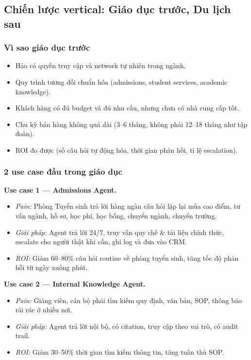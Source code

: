 \documentclass[11pt,a4paper]{article}
\begin{document}
\subsection{Chiến lược vertical: Giáo dục trước, Du lịch sau}

\subsubsection*{Vì sao giáo dục trước}

\begin{itemize}
\item Hảo có quyền truy cập và network tự nhiên trong ngành.
\item Quy trình tương đối chuẩn hóa (admissions, student services, academic knowledge).
\item Khách hàng có đủ budget và đủ nhu cầu, nhưng chưa có nhà cung cấp tốt.
\item Chu kỳ bán hàng không quá dài (3--6 tháng, không phải 12--18 tháng như tập đoàn).
\item ROI đo được (số câu hỏi tự động hóa, thời gian phản hồi, tỉ lệ escalation).
\end{itemize}

\subsubsection*{2 use case đầu trong giáo dục}

\textbf{Use case 1 — Admissions Agent.}
\begin{itemize}
\item \textit{Pain:} Phòng Tuyển sinh trả lời hàng ngàn câu hỏi lặp lại mùa cao điểm,
tư vấn ngành, hồ sơ, học phí, học bổng, chuyển ngành, chuyển trường.
\item \textit{Giải pháp:} Agent trả lời 24/7, truy vấn quy chế \& tài liệu chính
thức, escalate cho người thật khi cần, ghi log và đưa vào CRM.
\item \textit{ROI:} Giảm 60--80\% câu hỏi routine về phòng tuyển sinh, tăng tốc
độ phản hồi từ ngày xuống phút.
\end{itemize}

\textbf{Use case 2 — Internal Knowledge Agent.}
\begin{itemize}
\item \textit{Pain:} Giảng viên, cán bộ phải tìm kiếm quy định, văn bản, SOP,
thông báo rải rác ở nhiều nơi.
\item \textit{Giải pháp:} Agent trả lời nội bộ, có citation, truy cập theo vai
trò, có audit trail.
\item \textit{ROI:} Giảm 30--50\% thời gian tìm kiếm thông tin, tăng tuân thủ SOP.
\end{itemize}
\end{document}
